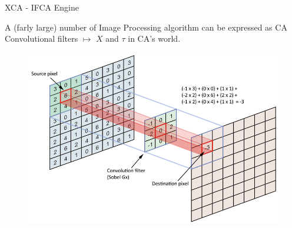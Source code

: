 \documentclass{beamer}
\begin{document}
		\begin{frame}{XCA - IFCA Engine }
\begin{block}{A (farly large) number of Image Processing algorithm can be expressed as CA}
Convolutional filters $\mapsto$ $X$ and $\tau$ in CA's world.

\end{block}		
		
		\begin{figure}
					\centering
					\includegraphics[scale=0.28]{./images/kernel_convolution}
				\end{figure}
		\end{frame}	
\end{document}
